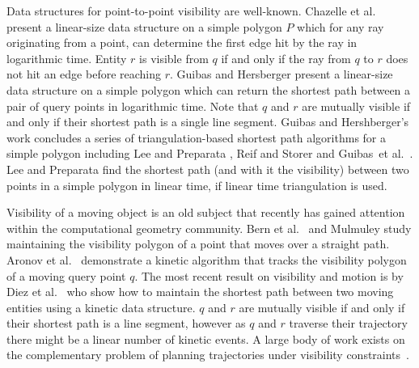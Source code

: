 \documentclass[UKenglish]{lipics-v2019}
\newcommand{\etal}{\textnormal{et al.}\xspace}
\begin{document}
Data structures for point-to-point visibility are well-known. 
Chazelle \etal~\cite{chazelle1994ray} present a linear-size data structure on a simple polygon $P$ which for any ray originating from a point, can determine the first edge hit by the ray in logarithmic time. Entity $r$ is visible from $q$ if and only if the ray from $q$ to $r$ does not hit an edge before reaching $r$. Guibas and Hersberger \cite{guibas1989optimal} present a linear-size data structure on a simple polygon which can return the shortest path between a pair of query points in logarithmic time. Note that $q$ and $r$ are mutually visible if and only if their shortest path is a single line segment.
Guibas and Hershberger's work concludes a series of triangulation-based shortest path algorithms for a simple polygon including Lee and Preparata \cite{LeeP84}, Reif and Storer \cite{ReifS85} and Guibas~\etal~\cite{GuibasHLST87}.
Lee and Preparata \cite{LeeP84} find the shortest path (and with it the visibility) between two points in a simple polygon in linear time, if linear time triangulation is used.


Visibility of a moving object is an old subject that recently has gained attention within the computational geometry community. Bern \etal~\cite{bern1994visibility} and  Mulmuley \cite{mulmuley1991hidden} study maintaining the visibility polygon of a point that moves over a straight path. 
Aronov \etal~\cite{aronov2002visibility} demonstrate a kinetic algorithm that tracks the visibility polygon of a moving query point $q$. The most recent result on visibility and motion is by Diez \etal~\cite{DKRRS2017KineticAPSPEuroCG} who show how to maintain the shortest path between two moving entities using a kinetic data structure. $q$ and $r$ are mutually visible if and only if their shortest path is a line segment, however as $q$ and $r$ traverse their trajectory there might be a linear number of kinetic events. A large body of work exists on the complementary problem of planning trajectories under visibility constraints~\cite{6907405}.
\end{document}
